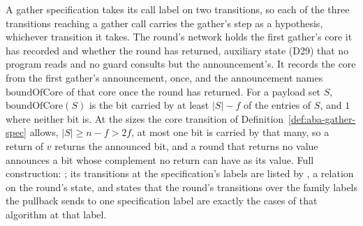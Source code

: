 \begin{definition}
  A gather specification takes its call label on two transitions, so each of the three transitions reaching a gather call carries the gather's step as a hypothesis, whichever transition it takes.
  The round's network holds the first gather's core it has recorded and whether the round has returned, auxiliary state (D29) that no program reads and no guard consults but the announcement's.
  It records the core from the first gather's announcement, once, and the announcement names $\mathrm{boundOfCore}$ of that core once the round has returned.
  For a payload set $S$, $\mathrm{boundOfCore}(S)$ is the bit carried by at least $|S| - f$ of the entries of $S$, and $1$ where neither bit is.
  At the sizes the core transition of Definition~\ref{def:aba-gather-spec} allows, $|S| \ge n - f > 2f$, at most one bit is carried by that many, so a return of $v$ returns the announced bit, and a round that returns no value announces a bit whose complement no return can have as its value.
  Full construction: ; its transitions at the specification's labels are listed by , a relation on the round's state, and  states that the round's transitions over the family labels the pullback sends to one specification label are exactly the cases of that algorithm at that label.
\end{definition}

